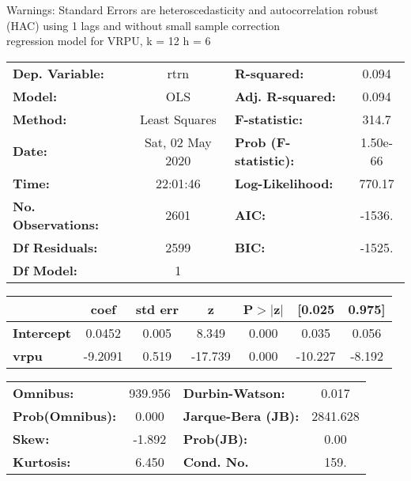 Warnings: \newline
 [1] Standard Errors are heteroscedasticity and autocorrelation robust (HAC) using 1 lags and without small sample correction\\ 

regression model for VRPU, k = 12 h = 6\begin{center}
\begin{tabular}{lclc}
\toprule
\textbf{Dep. Variable:}    &       rtrn       & \textbf{  R-squared:         } &     0.094   \\
\textbf{Model:}            &       OLS        & \textbf{  Adj. R-squared:    } &     0.094   \\
\textbf{Method:}           &  Least Squares   & \textbf{  F-statistic:       } &     314.7   \\
\textbf{Date:}             & Sat, 02 May 2020 & \textbf{  Prob (F-statistic):} &  1.50e-66   \\
\textbf{Time:}             &     22:01:46     & \textbf{  Log-Likelihood:    } &    770.17   \\
\textbf{No. Observations:} &        2601      & \textbf{  AIC:               } &    -1536.   \\
\textbf{Df Residuals:}     &        2599      & \textbf{  BIC:               } &    -1525.   \\
\textbf{Df Model:}         &           1      & \textbf{                     } &             \\
\bottomrule
\end{tabular}
\begin{tabular}{lcccccc}
                   & \textbf{coef} & \textbf{std err} & \textbf{z} & \textbf{P$> |$z$|$} & \textbf{[0.025} & \textbf{0.975]}  \\
\midrule
\textbf{Intercept} &       0.0452  &        0.005     &     8.349  &         0.000        &        0.035    &        0.056     \\
\textbf{vrpu}      &      -9.2091  &        0.519     &   -17.739  &         0.000        &      -10.227    &       -8.192     \\
\bottomrule
\end{tabular}
\begin{tabular}{lclc}
\textbf{Omnibus:}       & 939.956 & \textbf{  Durbin-Watson:     } &    0.017  \\
\textbf{Prob(Omnibus):} &   0.000 & \textbf{  Jarque-Bera (JB):  } & 2841.628  \\
\textbf{Skew:}          &  -1.892 & \textbf{  Prob(JB):          } &     0.00  \\
\textbf{Kurtosis:}      &   6.450 & \textbf{  Cond. No.          } &     159.  \\
\bottomrule
\end{tabular}
\end{center}

